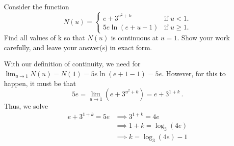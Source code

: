 \documentclass[11pt]{exam}
\begin{document}
\begin{questions}
\noindent{}
\question Consider the function
$$N(u) =  \left\lbrace \begin{array}{ll} \! \! e + 3^{u^2+k} & \textrm{if } u<1. \\ \!\! 5e \ln \left( e + u -1 \right) & \textrm{if } u \geqslant 1. \end{array}\right.$$
Find all values of k so that $N(u)$ is continuous at $u = 1$. Show your work carefully, and leave your answer(s) in exact form.
\begin{solution}
  With our definition of continuity, we need for \(\lim_{u \to 1} N(u)
  = N(1) = 5e\ln(e+1-1) = 5e\). However, for this to happen, it must
  be that \[
    5e = \lim_{u \to 1} (e+3^{u^2+k}) = e+3^{1+k} \,.
  \]
  Thus, we solve
  \begin{align*}
    e+3^{1+k} = 5e
    & \implies 3^{1+k} = 4e \\
    & \implies 1+k = \log_3(4e) \\
    & \implies k = \log_3(4e)-1
  \end{align*}

\end{solution}
\end{questions}
\ifprintanswers

\else

\fi
\ifprintanswers

\else

\fi
\end{document}
